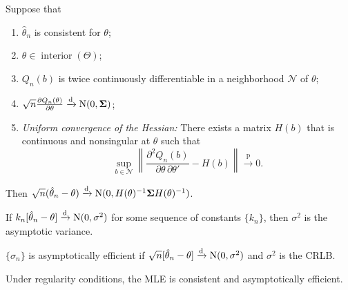 \documentclass[8pt,letterpaper, landscape]{extarticle} %
\newcommand{\mSigma}{\ensuremath{\mathbf{\Sigma}}}
\begin{document}
\begin{multicols}{3}
\begin{description}
Suppose that
\begin{enumerate}
\item $ \hat{\theta}_n $ is consistent for $ \theta $;
\item $ \theta \in \operatorname{interior} (\Theta) $;
\item $ Q_n(b) $ is twice continuously differentiable in a neighborhood $ \mathcal{N} $ of $ \theta $;
\item $ \sqrt{n} \frac{\partial Q_n (\theta)}{\partial \theta} \xrightarrow{\text{d}} \n (0, \mSigma) $;
\item \textit{Uniform convergence of the Hessian:} There exists a matrix $ H(b) $ that is continuous and nonsingular at $ \theta $ such that
$$ \sup_{b \in \mathcal{N}} \left \lVert \frac{\partial^2 Q_n (b)}{\partial \theta \, \partial \theta'} - H(b) \right \rVert \xrightarrow{\text{p}} 0 . $$
\end{enumerate}
Then $ \sqrt{n} (\hat{\theta}_n - \theta) \xrightarrow{\text{d}} \n (0, H(\theta)^{-1} \mSigma H(\theta)^{-1}) $.

 If $ k_n [\hat{\theta}_n - \theta] \xrightarrow{\text{d}} \operatorname{N} (0, \sigma^2)  $ for some sequence of constants $ \{ k_n \} $, then $ \sigma^2 $ is the asymptotic variance.

 $ \{ \hat{\sigma}_n \} $ is asymptotically efficient if $ \sqrt{n} [\hat{\theta}_n - \theta] \xrightarrow{\text{d}} \operatorname{N} (0, \sigma^2) $ and  $ \sigma^2 $ is the CRLB.

Under regularity conditions, the MLE is consistent and asymptotically efficient.


\end{description}
\end{multicols}
\end{document}
